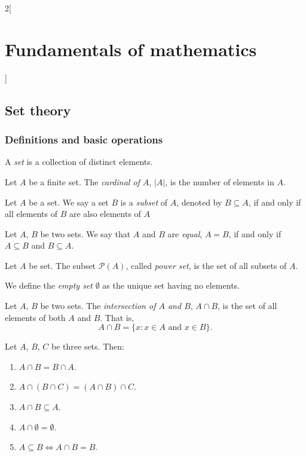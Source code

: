 \documentclass[../../../main.tex]{subfiles}
\begin{document}
\begin{multicols}{2}[\section{Fundamentals of mathematics}]
\subsection{Set theory}
\subsubsection*{Definitions and basic operations}
\begin{definition}
    A \textit{set} is a collection of distinct elements.
\end{definition}
\begin{definition}
    Let $A$ be a finite set. The \textit{cardinal of $A$}, $|A|$, is the number of elements in $A$.
\end{definition}
\begin{definition}
    Let $A$ be a set. We say a set $B$ is a \textit{subset} of $A$, denoted by $B\subseteq A$, if and only if all elements of $B$ are also elements of $A$
\end{definition}
\begin{definition}
    Let $A$, $B$ be two sets. We say that $A$ and $B$ are \textit{equal}, $A=B$, if and only if $A\subseteq B$ and $B\subseteq A$.
\end{definition}
\begin{definition}
    Let $A$ be set. The subset $\mathcal{P}(A)$, called \textit{power set}, is the set of all subsets of $A$.
\end{definition}
\begin{definition}
    We define the \textit{empty set} $\emptyset$ as the unique set having no elements.
\end{definition}
\begin{definition}
    Let $A$, $B$ be two sets. The \textit{intersection of $A$ and $B$}, $A\cap B$, is the set of all elements of both $A$ and $B$. That is, $$A\cap B=\{x:x\in A\text{ and }x\in B\}.$$
\end{definition}
\begin{prop}
    Let $A$, $B$, $C$ be three sets. Then:
    \begin{enumerate}
        \item $A\cap B=B\cap A$.
        \item $A\cap(B\cap C)=(A\cap B)\cap C$.
        \item $A\cap B\subseteq A$.
        \item $A\cap\emptyset=\emptyset$.
        \item $A\subseteq B\iff A\cap B=B$.

\end{enumerate}
\end{prop}
\end{multicols}
\end{document}
